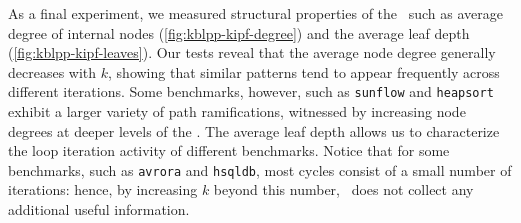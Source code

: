 \noindent As a final experiment, we measured structural properties of the \kipf\ such as average degree of internal nodes (\myfigure\ref{fig:kblpp-kipf-degree}) and the average leaf depth (\myfigure\ref{fig:kblpp-kipf-leaves}). Our tests reveal that the average node degree generally decreases with $k$, showing that similar patterns tend to appear frequently across different iterations. Some benchmarks, however, such as {\tt sunflow} and {\tt heapsort} exhibit a larger variety of path ramifications, witnessed by increasing node degrees at deeper levels of the \kipf. The average leaf depth allows us to characterize the loop iteration activity of different benchmarks. Notice that for some benchmarks, such as {\tt avrora} and {\tt hsqldb}, most cycles consist of a small number of iterations: hence, by increasing $k$ beyond this number, \kblpp\ does not collect any additional useful information.